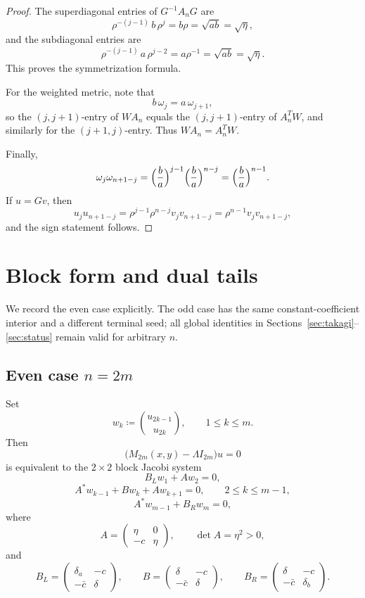 \documentclass[11pt]{article}
\begin{document}
\begin{proof}
The superdiagonal entries of \(G^{-1}A_nG\) are
\[
\rho^{-(j-1)}\,b\,\rho^{j}=b\rho=\sqrt{ab}=\sqrt{\eta},
\]
and the subdiagonal entries are
\[
\rho^{-(j-1)}\,a\,\rho^{j-2}=a\rho^{-1}=\sqrt{ab}=\sqrt{\eta}.
\]
This proves the symmetrization formula.

For the weighted metric, note that
\[
b\,\omega_j=a\,\omega_{j+1},
\]
so the \((j,j+1)\)-entry of \(WA_n\) equals the \((j,j+1)\)-entry of \(A_n^T W\), and similarly
for the \((j+1,j)\)-entry. Thus \(WA_n=A_n^T W\).

Finally,
\[
\omega_j\omega_{n+1-j}
=
\Bigl(\frac ba\Bigr)^{j-1}\Bigl(\frac ba\Bigr)^{n-j}
=
\Bigl(\frac ba\Bigr)^{n-1}.
\]
If \(u=Gv\), then
\[
u_j u_{n+1-j}
=
\rho^{j-1}\rho^{n-j} v_j v_{n+1-j}
=
\rho^{n-1} v_j v_{n+1-j},
\]
and the sign statement follows.
\end{proof}

\section{Block form and dual tails}

We record the even case explicitly. The odd case has the same constant-coefficient interior and a
different terminal seed; all global identities in Sections~\ref{sec:takagi}--\ref{sec:status}
remain valid for arbitrary \(n\).

\subsection*{Even case \(n=2m\)}

Set
\[
w_k\coloneqq \binom{u_{2k-1}}{u_{2k}},
\qquad
1\le k\le m.
\]
Then
\[
\bigl(M_{2m}(x,y)-\Lambda I_{2m}\bigr)u=0
\]
is equivalent to the \(2\times2\) block Jacobi system
\[
B_L w_1 + A w_2 = 0,
\]
\[
A^* w_{k-1}+Bw_k+Aw_{k+1}=0,
\qquad
2\le k\le m-1,
\]
\[
A^*w_{m-1}+B_R w_m=0,
\]
where
\[
A=
\begin{pmatrix}
\eta & 0\\
-c & \eta
\end{pmatrix},
\qquad
\det A=\eta^2>0,
\]
and
\[
B_L=
\begin{pmatrix}
\delta_a & -c\\
-\bar c & \delta
\end{pmatrix},
\qquad
B=
\begin{pmatrix}
\delta & -c\\
-\bar c & \delta
\end{pmatrix},
\qquad
B_R=
\begin{pmatrix}
\delta & -c\\
-\bar c & \delta_b
\end{pmatrix}.
\]
\end{document}
